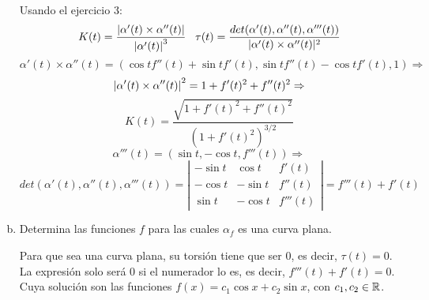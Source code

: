 \documentclass[12pt]{article}
\theoremstyle{definition}
\theoremstyle{remark}
\begin{document}
\begin{enumerate}[(a)]
Usando el ejercicio 3:
\[
K(t)=\frac{\left| \alpha'(t)\times\alpha''(t) \right|}{\left| \alpha'(t) \right|^3} \;\;\; \tau(t)=\frac{det(\alpha'(t),\alpha''(t),\alpha'''(t))}{|\alpha'(t)\times\alpha''(t)|^2}
\]
\[
\alpha'(t)\times\alpha''(t)=(\cos tf''(t)+\sin tf'(t), \sin tf''(t)-\cos tf'(t),1) \Rightarrow
\]
\[
\left| \alpha'(t)\times\alpha''(t) \right|^2=1+f'(t)^2+f''(t)^2 \Rightarrow
\]
\[
K(t)=\frac{\sqrt{1+f'(t)^2+f''(t)^2}}{(1+f'(t)^2)^{3/2}}
\]
\[
\alpha'''(t)=(\sin t, -\cos t,f'''(t)) \Rightarrow 
\]
\[
det(\alpha'(t),\alpha''(t),\alpha'''(t))=
\left|
\begin{array}{ccc}
-\sin t & \cos t & f'(t) \\
-\cos t & -\sin t & f''(t) \\
\sin t & -\cos t & f'''(t)
\end{array}
\right|=f'''(t)+f'(t)
\]

\item Determina las funciones $f$ para las cuales $\alpha_f$ es una curva plana.

Para que sea una curva plana, su torsión tiene que ser 0, es decir, $\tau(t)=0$. 
La expresión solo será 0 si el numerador lo es, es decir, $f'''(t)+f'(t)=0$. Cuya solución son las funciones $f(x)=c_1\cos x+c_2\sin x$, con $c_1,c_2\in\mathbb{R}$.

\end{enumerate}
\end{document}
